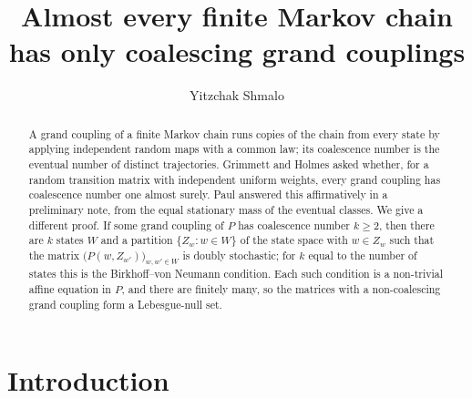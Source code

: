 \documentclass[11pt]{amsart}
\theoremstyle{remark}
\begin{document}
\title[Coalescence of grand couplings]{Almost every finite Markov chain has only coalescing grand couplings}
\author{Yitzchak Shmalo}
\address{Einstein Institute of Mathematics, The Hebrew University of Jerusalem, Jerusalem, Israel}

\begin{abstract}
A grand coupling of a finite Markov chain runs copies of the chain from every state by applying independent random
maps with a common law; its coalescence number is the eventual number of distinct trajectories. Grimmett and Holmes
asked whether, for a random transition matrix with independent uniform weights, every grand coupling has
coalescence number one almost surely. Paul answered this affirmatively in a preliminary note, from the equal
stationary mass of the eventual classes. We give a different proof. If some grand coupling of $P$ has coalescence number
$k\ge2$, then there are $k$ states $W$ and a partition $\{Z_w:w\in W\}$ of the state space with $w\in Z_w$ such that the
matrix $\bigl(P(w,Z_{w'})\bigr)_{w,w'\in W}$ is doubly stochastic; for $k$ equal to the number of states this is the
Birkhoff--von Neumann condition. Each such condition is a non-trivial affine equation in $P$, and there are finitely
many, so the matrices with a non-coalescing grand coupling form a Lebesgue-null set.
\end{abstract}

\maketitle

\section{Introduction}\label{sec:intro}
\end{document}
